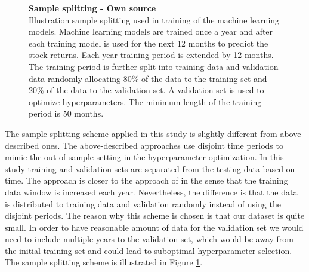 \documentclass[12pt]{article}
\begin{document}
\begin{figure}[ht]
\centering
\caption[Sample splitting scheme]{\textbf{Sample splitting \textnormal{- Own source}}\\ Illustration sample splitting used in training of the machine learning models. Machine learning models are trained once a year and after each training model is used for the next 12 months to predict the stock returns. Each year training period is extended by 12 months. The training period is further split into training data and validation data randomly allocating 80\% of the data to the training set and 20\% of the data to the validation set. A validation set is used to optimize hyperparameters. The minimum length of the training period is 50 months.}
\label{plot:SampleSplitting}
\end{figure}

The sample splitting scheme applied in this study is slightly different from above described ones. The above-described approaches use disjoint time periods to mimic the out-of-sample setting in the hyperparameter optimization. In this study training and validation sets are separated from the testing data based on time. The approach is closer to the approach of \citet{guetal} in the sense that the training data window is increased each year.\footnotemark {} Nevertheless, the difference is that the data is distributed to training data and validation randomly instead of using the disjoint periods. The reason why this scheme is chosen is that our dataset is quite small. In order to have reasonable amount of data for the validation set we would need to include multiple years to the validation set, which would be away from the initial training set and could lead to suboptimal hyperparameter selection. The sample splitting scheme is illustrated in Figure \ref{plot:SampleSplitting}. \par
\end{document}
